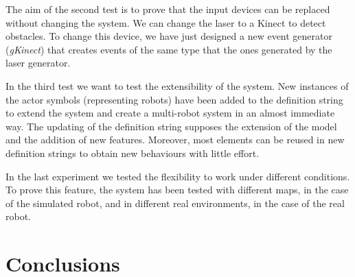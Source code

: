 \documentclass{svmult}
\begin{document}
The aim of the second test is to prove that the input devices can be replaced without changing the system. We can change the laser to a Kinect to detect obstacles. To change this device, we have just designed a new event generator (\textit{gKinect}) that creates events of the same type that the ones generated by the laser generator.


In the third test we want to test the extensibility of the system. New instances of the actor symbols (representing robots) have been added to the definition string to extend the system and create a multi-robot system in an almost immediate way. The updating of the definition string supposes the extension of the model and the addition of new features. Moreover, most elements can be reused in new definition strings to obtain new behaviours with little effort.

In the last experiment we tested the flexibility to work under different conditions. To prove this feature, the system has been tested with different maps, in the case of the simulated robot, and in different real environments, in the case of the real robot.




\section{Conclusions}
\end{document}

